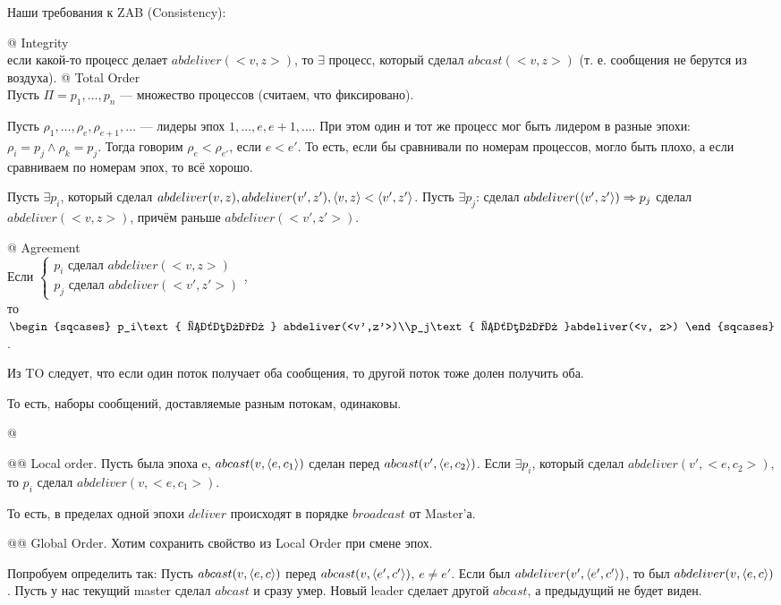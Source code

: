 Наши требования к ZAB (Consistency):
\begin{el}[ol]
@ Integrity\\
если какой-то процесс делает $abdeliver(<v,z>)$, то $\exists$ процесс, который сделал $abcast(<v,z>)$ (т. е. сообщения не берутся из воздуха).
@ Total Order\\
Пусть $\Pi ={p_1, \dots, p_n}$ --- множество процессов (считаем, что фиксировано).

\begin{note}
Пусть $\rho_1, \dots, \rho_e, \rho_{e+1}, \dots$ --- лидеры эпох $1, \dots, e, e+1, \dots$.
При этом один и тот же процесс мог быть лидером в разные эпохи: $\rho_i = p_j \land \rho_k = p_j$. Тогда говорим
$\rho_e < \rho_{e'}$, если $e<e'$.
То есть, если бы сравнивали по номерам процессов, могло быть плохо, а если сравниваем по номерам эпох, то всё хорошо.
\end{note}

Пусть $\exists p_i$, который сделал $abdeliver(v, z), abdeliver(v', z'), \langle v, z\rangle < \langle v', z'\rangle$. Пусть $\exists p_j$: сделал $abdeliver(\langle v', z'\rangle) \Rightarrow p_j$ сделал $abdeliver(<v,z>)$, причём  раньше $abdeliver(<v', z'>)$.

@ Agreement\\
Если $\begin{cases} p_i\text{ сделал }abdeliver(<v,z>)\\ p_j\text{ сделал } abdeliver(<v',z'>)\end{cases}$,\\
то $\begin{sqcases} p_i\text{ сделал } abdeliver(<v',z'>)\\p_j\text{ сделал }abdeliver(<v, z>) \end{sqcases}$.
\begin{note}
Из TO следует, что если один поток получает оба сообщения, то другой поток тоже долен получить оба.
\end{note}
То есть, наборы сообщений, доставляемые разным потокам, одинаковы.

@
\begin{el}[ol]
@@ Local order. 
Пусть была эпоха e, $abcast(v, \langle e,c_1\rangle)$ сделан перед $abcast(v', \langle e, c_2\rangle)$.
Если $\exists p_i$, который сделал $abdeliver(v', <e, c_2>)$, то $p_i$ сделал $abdeliver(v, <e, c_1>)$.

То есть, в пределах одной эпохи $deliver$ происходят в порядке $broadcast$ от Master'а.

@@ Global Order.
Хотим сохранить свойство из Local Order при смене эпох.
\begin{note}
Попробуем определить так:
Пусть $abcast(v, \langle e,c\rangle)$ перед $abcast(v, \langle e', c'\rangle)$, $e \ne e'$. Если был $abdeliver(v', \langle e', c'\rangle)$, то был $abdeliver(v, \langle e, c\rangle)$.
Пусть у нас текущий master сделал $abcast$ и сразу умер. Новый leader сделает другой $abcast$, а предыдущий не будет виден.
\end{note}


\end{el}
\end{el}
